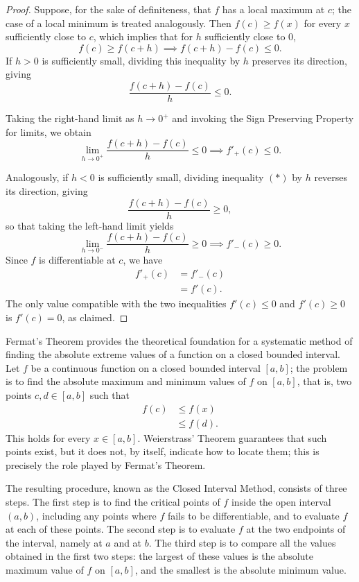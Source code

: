 \begin{proof}
Suppose, for the sake of definiteness, that $f$ has a local maximum at $c$; the case of a local minimum is treated analogously. Then $f(c) \geq f(x)$ for every $x$ sufficiently close to $c$, which implies that for $h$ sufficiently close to $0$,
\begin{equation*}
f(c) \geq f(c+h) \implies f(c+h) - f(c) \leq 0. \tag{$*$}
\end{equation*}
If $h > 0$ is sufficiently small, dividing this inequality by $h$ preserves its direction, giving
\[
\frac{f(c+h) - f(c)}{h} \leq 0.
\]

Taking the right-hand limit as $h \to 0^+$ and invoking the Sign Preserving Property for limits, we obtain
\[
\lim_{h \to 0^+} \frac{f(c+h) - f(c)}{h} \leq 0 \implies f'_+(c) \leq 0.
\]

Analogously, if $h < 0$ is sufficiently small, dividing inequality $(*)$ by $h$ reverses its direction, giving
\[
\frac{f(c+h) - f(c)}{h} \geq 0,
\] so that taking the left-hand limit yields
\[
\lim_{h \to 0^-} \frac{f(c+h) - f(c)}{h} \geq 0 \implies f'_-(c) \geq 0.
\]
Since $f$ is differentiable at $c$, we have
\[
\begin{aligned}
f'_+(c) &= f'_-(c) \\
&= f'(c).
\end{aligned}
\]
The only value compatible with the two inequalities $f'(c) \leq 0$ and $f'(c) \geq 0$ is $f'(c) = 0$, as claimed.
\end{proof}


Fermat's Theorem provides the theoretical foundation for a systematic method of finding the absolute extreme values of a function on a closed bounded interval. Let $f$ be a continuous function on a closed bounded interval $[a,b]$; the problem is to find the absolute maximum and minimum values of $f$ on $[a,b]$, that is, two points $c, d \in [a,b]$ such that
\[
\begin{aligned}
f(c) &\leq f(x) \\
&\leq f(d).
\end{aligned}
\]
This holds for every $x \in [a,b]$. Weierstrass' Theorem guarantees that such points exist, but it does not, by itself, indicate how to locate them; this is precisely the role played by Fermat's Theorem.

The resulting procedure, known as the Closed Interval Method, consists of three steps. The first step is to find the critical points of $f$ inside the open interval $(a,b)$, including any points where $f$ fails to be differentiable, and to evaluate $f$ at each of these points. The second step is to evaluate $f$ at the two endpoints of the interval, namely at $a$ and at $b$. The third step is to compare all the values obtained in the first two steps: the largest of these values is the absolute maximum value of $f$ on $[a,b]$, and the smallest is the absolute minimum value.

